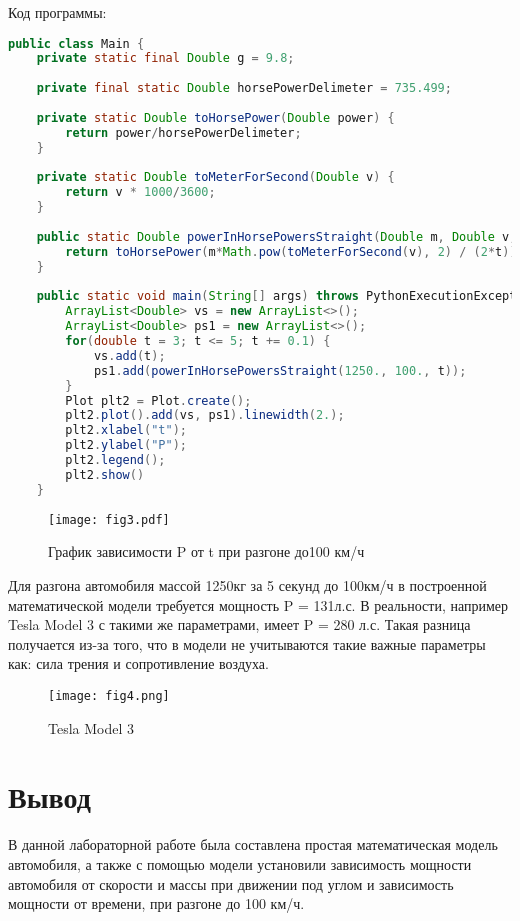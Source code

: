 \documentclass[a4paper, 14pt]{extarticle}
\begin{document}
			Код программы:
			\begin{lstlisting}[language=Java]
public class Main {
	private static final Double g = 9.8;
	
	private final static Double horsePowerDelimeter = 735.499;
	
	private static Double toHorsePower(Double power) {
		return power/horsePowerDelimeter;
	}
	
	private static Double toMeterForSecond(Double v) {
		return v * 1000/3600;
	}
	
	public static Double powerInHorsePowersStraight(Double m, Double v, Double t) {
		return toHorsePower(m*Math.pow(toMeterForSecond(v), 2) / (2*t));
	}
	
	public static void main(String[] args) throws PythonExecutionException, IOException {
		ArrayList<Double> vs = new ArrayList<>();
		ArrayList<Double> ps1 = new ArrayList<>();
		for(double t = 3; t <= 5; t += 0.1) {
			vs.add(t);
			ps1.add(powerInHorsePowersStraight(1250., 100., t));
		}
		Plot plt2 = Plot.create();
		plt2.plot().add(vs, ps1).linewidth(2.);
		plt2.xlabel("t");
		plt2.ylabel("P");
		plt2.legend();
		plt2.show()
	}
			\end{lstlisting}
			\begin{figure}[H]
				\centering
				\texttt{[image: fig3.pdf]}
				\caption[.] {График зависимости P от t при разгоне до100 км/ч}
			\end{figure}
			Для разгона автомобиля массой 1250кг за 5 секунд до 100км/ч в 
			построенной математической модели требуется мощность P = 131л.с.
			В реальности, например Tesla Model 3 с такими же параметрами, имеет P = 280 л.с.
			Такая разница получается из-за того, что в модели не учитываются такие важные параметры
			как: сила трения и сопротивление воздуха.
			\begin{figure}[H]
				\centering
				\texttt{[image: fig4.png]}
				\caption[.] {Tesla Model 3}
			\end{figure}
		\section{Вывод}
			В данной лабораторной работе была составлена простая математическая модель автомобиля,
			а также с помощью модели установили зависимость мощности автомобиля от скорости и массы
			при движении под углом и зависимость мощности от времени, при разгоне до 100 км/ч.
\end{document}
